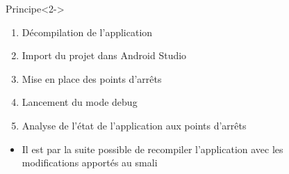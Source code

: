 \documentclass[aspectratio=1610, handout]{beamer}%
\begin{document}
\begin{frame}
  \slidetitle[Debugger]
  \begin{columns}
    \begin{column}{0.7\linewidth}
      \begin{block}{Principe}<2->
        \begin{enumerate}
        \item<3-> Décompilation de l'application
        \item<4-> Import du projet dans Android Studio
        \item<5-> Mise en place des points d'arrêts
        \item<6-> Lancement du mode debug
        \item<7-> Analyse de l'état de l'application aux points d'arrêts 
        \end{enumerate}
        \begin{itemize}
        \item<8-> Il est par la suite possible de recompiler l'application avec les modifications apportés au smali
        \end{itemize}
      \end{block}
    \end{column}
    \begin{column}{0.25\linewidth}     
      \centering
     \begin{overlayarea}{0.6\linewidth}{\linewidth}

\end{overlayarea}
\end{column}
\end{columns}
\end{frame}
\end{document}
